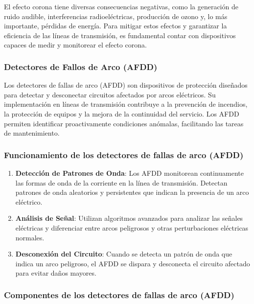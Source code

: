         El efecto corona tiene diversas consecuencias negativas, como la generación de ruido audible, interferencias radioeléctricas, producción de ozono y, lo más importante, pérdidas de energía. Para mitigar estos efectos y garantizar la eficiencia de las líneas de transmisión, es fundamental contar con dispositivos capaces de medir y monitorear el efecto corona.

        \subsubsection{Detectores de Fallos de Arco (AFDD)}

            Los detectores de fallas de arco (AFDD) son dispositivos de protección diseñados para detectar y desconectar circuitos afectados por arcos eléctricos. Su implementación en líneas de transmisión contribuye a la prevención de incendios, la protección de equipos y la mejora de la continuidad del servicio. Los AFDD permiten identificar proactivamente condiciones anómalas, facilitando las tareas de mantenimiento.

        \subsubsection*{Funcionamiento de los detectores de fallas de arco (AFDD)}

            \begin{enumerate}
                \item \textbf{Detección de Patrones de Onda}: Los AFDD monitorean continuamente las formas de onda de la corriente en la línea de transmisión. Detectan patrones de onda aleatorios y persistentes que indican la presencia de un arco eléctrico.
                \item \textbf{Análisis de Señal}: Utilizan algoritmos avanzados para analizar las señales eléctricas y diferenciar entre arcos peligrosos y otras perturbaciones eléctricas normales.
                \item \textbf{Desconexión del Circuito}: Cuando se detecta un patrón de onda que indica un arco peligroso, el AFDD se dispara y desconecta el circuito afectado para evitar daños mayores.
            \end{enumerate}

        \subsubsection*{Componentes de los detectores de fallas de arco (AFDD)}
            
